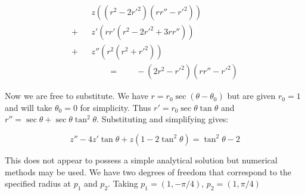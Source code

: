 \documentclass[pdflatex,sn-mathphys-num]{sn-jnl}%
\theoremstyle{thmstyleone}%
\theoremstyle{thmstyletwo}%
\theoremstyle{thmstylethree}%
\begin{document}
\begin{eqnarray}
 &{}&z  \left((r^2 - 2r'^2)(rr''-r'^2)\right)\nonumber\\
+&{}&z'  \left(rr'(r^2 - 2r'^2 + 3rr'')\right)\nonumber\\
+&{}&z''  \left(r^2    (r^2+r'^2)       \right)\\
&{}&\qquad =\qquad -(2r^2-r'^2)(rr''-r'^2)
\end{eqnarray}

Now we are free to substitute.  We have $r=r_0\sec(\theta-\theta_0)$
but are given $r_0=1$ and will take $\theta_0=0$ for simplicity.  Thus
$r'= r_0\sec\theta\tan\theta$ and $r''=\sec\theta +
\sec\theta\tan^2\theta$.  Substituting and simplifying gives:

\begin{equation}\label{string_ODE}
z'' - 4z'\tan \theta + z(1-2\tan^2\theta) = \tan^2\theta - 2
\end{equation}


This does not appear to possess a simple analytical solution but
numerical methods may be used.  We have two degrees of freedom that
correspond to the specified radius at $p_1$ and $p_2$.  Taking
$p_1=(1,-\pi/4)$, $p_2=(1,\pi/4)$




\end{document}
